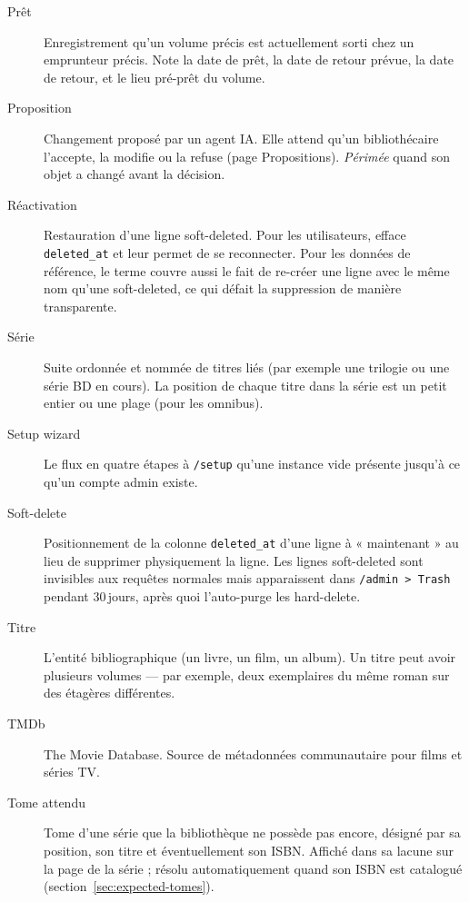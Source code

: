 \begin{description}
  \item[Prêt] Enregistrement qu'un volume précis est
        actuellement sorti chez un emprunteur précis. Note la date
        de prêt, la date de retour prévue, la date de retour, et
        le lieu pré-prêt du volume.

  \item[Proposition] Changement proposé par
        un agent IA. Elle attend qu'un bibliothécaire l'accepte, la
        modifie ou la refuse (page Propositions).
        \emph{Périmée} quand son objet a changé avant la décision.

  \item[Réactivation] Restauration d'une ligne soft-deleted. Pour
        les utilisateurs, efface \texttt{deleted\_at} et leur
        permet de se reconnecter. Pour les données de référence,
        le terme couvre aussi le fait de re-créer une ligne avec
        le même nom qu'une soft-deleted, ce qui défait la
        suppression de manière transparente.

  \item[Série] Suite ordonnée et nommée de titres
        liés (par exemple une trilogie ou une série BD en cours).
        La position de chaque titre dans la série est un petit
        entier ou une plage (pour les omnibus).

  \item[Setup wizard] Le flux en quatre étapes
        à \texttt{/setup} qu'une instance vide présente jusqu'à
        ce qu'un compte admin existe.

  \item[Soft-delete] Positionnement de la
        colonne \texttt{deleted\_at} d'une ligne à « maintenant »
        au lieu de supprimer physiquement la ligne. Les lignes
        soft-deleted sont invisibles aux requêtes normales mais
        apparaissent dans \texttt{/admin > Trash} pendant
        30\,jours, après quoi l'auto-purge les hard-delete.

  \item[Titre] L'entité bibliographique (un livre, un film, un
        album). Un titre peut avoir plusieurs volumes — par
        exemple, deux exemplaires du même roman sur des étagères
        différentes.

  \item[TMDb] The Movie Database. Source de
        métadonnées communautaire pour films et séries TV.

  \item[Tome attendu] Tome d'une série que la
        bibliothèque ne possède pas encore, désigné par sa position,
        son titre et éventuellement son ISBN. Affiché dans sa lacune
        sur la page de la série ; résolu automatiquement quand son
        ISBN est catalogué (section~\ref{sec:expected-tomes}).


\end{description}
